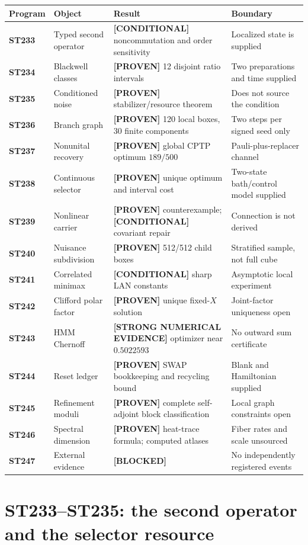 \documentclass[11pt,a4paper]{article}
\newcommand{\Proven}{\textcolor{proved}{\textbf{[PROVEN]}}}
\newcommand{\Evidence}{\textcolor{conditional}{\textbf{[STRONG NUMERICAL EVIDENCE]}}}
\newcommand{\Conditional}{\textcolor{conditional}{\textbf{[CONDITIONAL]}}}
\newcommand{\Blocked}{\textcolor{blocked}{\textbf{[BLOCKED]}}}
\begin{document}
\small
\begin{longtable}{@{}>{\bfseries}p{}p{}p{}p{}@{}}
\toprule
Program & Object & Result & Boundary\\
\midrule
\endhead
ST233 & Typed second operator & \Conditional{} noncommutation and order sensitivity & Localized state is supplied\\
ST234 & Blackwell classes & \Proven{} 12 disjoint ratio intervals & Two preparations and time supplied\\
ST235 & Conditioned noise & \Proven{} stabilizer/resource theorem & Does not source the condition\\
ST236 & Branch graph & \Proven{} 120 local boxes, 30 finite components & Two steps per signed seed only\\
ST237 & Nonunital recovery & \Proven{} global CPTP optimum $189/500$ & Pauli-plus-replacer channel\\
ST238 & Continuous selector & \Proven{} unique optimum and interval cost & Two-state bath/control model supplied\\
ST239 & Nonlinear carrier & \Proven{} counterexample; \Conditional{} covariant repair & Connection is not derived\\
ST240 & Nuisance subdivision & \Proven{} 512/512 child boxes & Stratified sample, not full cube\\
ST241 & Correlated minimax & \Conditional{} sharp LAN constants & Asymptotic local experiment\\
ST242 & Clifford polar factor & \Proven{} unique fixed-$X$ solution & Joint-factor uniqueness open\\
ST243 & HMM Chernoff & \Evidence{} optimizer near $0.5022593$ & No outward sum certificate\\
ST244 & Reset ledger & \Proven{} SWAP bookkeeping and recycling bound & Blank and Hamiltonian supplied\\
ST245 & Refinement moduli & \Proven{} complete self-adjoint block classification & Local graph constraints open\\
ST246 & Spectral dimension & \Proven{} heat-trace formula; computed atlases & Fiber rates and scale unsourced\\
ST247 & External evidence & \Blocked{} & No independently registered events\\
\bottomrule
\end{longtable}
\normalsize

\section{ST233--ST235: the second operator and the selector resource}
\end{document}
